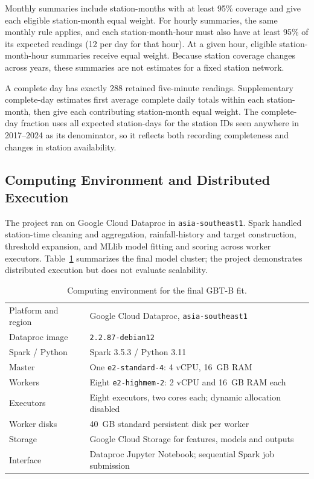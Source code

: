 \documentclass[11pt,a4paper]{article}
\begin{document}
Monthly summaries include station-months with at least 95\% coverage and give
each eligible station-month equal weight. For hourly summaries, the same
monthly rule applies, and each station-month-hour must also have at least 95\%
of its expected readings (12 per day for that hour). At a given hour, eligible
station-month-hour summaries receive equal weight. Because station coverage
changes across years, these summaries are not estimates for a fixed station
network.

A complete day has exactly 288 retained five-minute readings. Supplementary
complete-day estimates first average complete daily totals within each
station-month, then give each contributing station-month equal weight. The
complete-day fraction uses all expected station-days for the station IDs seen
anywhere in 2017--2024 as its denominator, so it reflects both recording
completeness and changes in station availability.

\subsection{Computing Environment and Distributed Execution}
The project ran on Google Cloud Dataproc in \texttt{asia-southeast1}. Spark
handled station-time cleaning and aggregation, rainfall-history and target
construction, threshold expansion, and MLlib model fitting and scoring across
worker executors. Table~\ref{tab:cluster} summarizes the final model cluster;
the project demonstrates distributed execution but does not evaluate
scalability.

\begin{table}[htbp]
\centering\small
\caption{Computing environment for the final GBT-B fit.}
\label{tab:cluster}
\begin{tabularx}{\linewidth}{l X}
\toprule
Platform and region & Google Cloud Dataproc, \texttt{asia-southeast1} \\
Dataproc image & \texttt{2.2.87-debian12} \\
Spark / Python & Spark 3.5.3 / Python 3.11~\cite{spark,dataprocimage} \\
Master & One \texttt{e2-standard-4}: 4 vCPU, 16~GB RAM~\cite{gceE2} \\
Workers & Eight \texttt{e2-highmem-2}: 2 vCPU and 16~GB RAM each~\cite{gceE2} \\
Executors & Eight executors, two cores each; dynamic allocation disabled \\
Worker disks & 40~GB standard persistent disk per worker \\
Storage & Google Cloud Storage for features, models and outputs \\
Interface & Dataproc Jupyter Notebook; sequential Spark job submission \\
\bottomrule
\end{tabularx}
\end{table}
\end{document}
